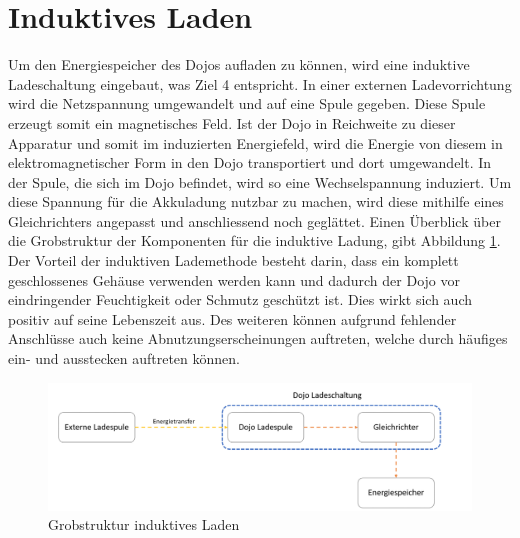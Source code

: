 \section{Induktives Laden}
Um den Energiespeicher des Dojos aufladen zu können, wird eine induktive Ladeschaltung eingebaut, was Ziel 4 entspricht. In einer externen Ladevorrichtung wird die Netzspannung umgewandelt und auf eine Spule gegeben. Diese Spule erzeugt somit ein magnetisches Feld. Ist der Dojo in Reichweite zu dieser Apparatur und somit im induzierten Energiefeld, wird die Energie von diesem in elektromagnetischer Form in den Dojo transportiert und dort umgewandelt. In der Spule, die sich im Dojo befindet, wird so eine Wechselspannung induziert. Um diese Spannung für die Akkuladung nutzbar zu machen, wird diese mithilfe eines Gleichrichters angepasst und anschliessend noch geglättet. Einen Überblick über die Grobstruktur der Komponenten für die induktive Ladung, gibt Abbildung \ref{fig:Grobstruktur_ind_Laden}. Der Vorteil der induktiven Lademethode besteht darin, dass ein komplett geschlossenes Gehäuse verwenden werden kann und dadurch der Dojo vor eindringender Feuchtigkeit oder Schmutz geschützt ist. Dies wirkt sich auch positiv auf seine Lebenszeit aus. Des weiteren können aufgrund fehlender Anschlüsse auch keine Abnutzungserscheinungen auftreten, welche durch häufiges ein- und ausstecken auftreten können.

\begin{figure}[H]
\begin{center}
	\includegraphics[width=160mm]{data/Induktion.png}
	\caption{Grobstruktur induktives Laden} %
	\label{fig:Grobstruktur_ind_Laden}
\end{center}
\end{figure}